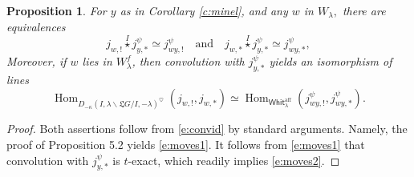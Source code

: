 \documentclass[11pt,reqno]{amsart}
\newcommand{\aff}{\operatorname{aff}}
\newcommand{\fL}{\mathfrak{L}}
\newcommand{\halpha}{\check{\alpha}}
\newcommand{\on}{\operatorname}
\newtheorem{pro}[subsubsection]{Proposition}
\theoremstyle{remark}
\numberwithin{equation}{section}
\newcommand{\Whit}{\mathsf{Whit}}
\begin{document}
\begin{pro} For $y$ as in Corollary \ref{c:minel}, and any $w$ in $W_\lambda,$ 
there are equivalences 
	\begin{equation}\label{e:moves1}
	j_{w, !} \overset{I}{\star} j_{y, *}^\psi \simeq j_{wy, !}^\psi \quad 
	\text{and} \quad 
	j_{w, *} \overset{I}{\star} j_{y, *}^\psi \simeq j_{wy, *}^\psi,
	\end{equation}
	 Moreover, if $w$ lies in 
	$W_\lambda^f$, then convolution with $j_{y, *}^\psi$ yields an 
	isomorphism of lines
	\begin{equation} \label{e:moves2}
	\on{Hom}_{D_{-\kappa}(I, \lambda \backslash \fL G / I, 
		-\lambda)^\heartsuit}(j_{w, !}, j_{w, *}) \simeq 
	\on{Hom}_{\Whit^{\aff}_{\lambda}}(j_{wy, !}^\psi, j_{wy, *}^\psi).
	\end{equation} 
\end{pro}

\begin{proof} Both assertions follow from \eqref{e:convid} by standard 
arguments. Namely, the proof of \cite{ly} Proposition 5.2  
yields \eqref{e:moves1}. It follows from \eqref{e:moves1} that convolution 
with $j_{y, *}^\psi$ is $t$-exact, which readily implies \eqref{e:moves2}.  
\end{proof}

%
%


%
%
\end{document}
